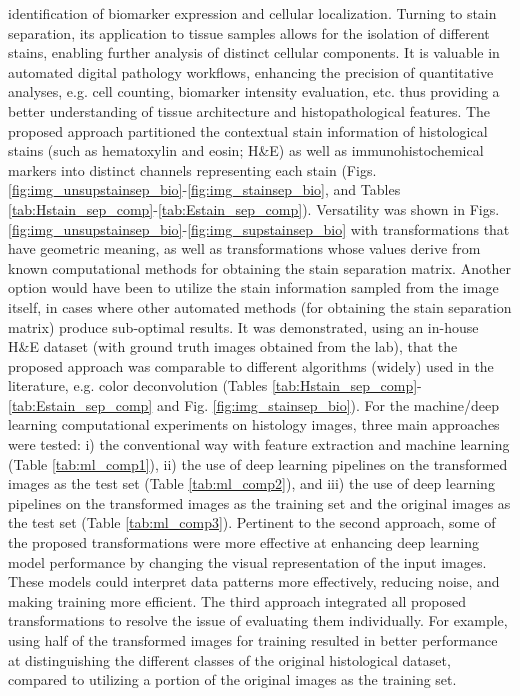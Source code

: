 \documentclass[superscriptaddress,longbibliography,aps,prl,twocolumn,10pt]{revtex4-2}
\begin{document}
identification of biomarker expression and cellular localization. Turning to stain separation, its application to tissue samples allows for the isolation of different stains, enabling further analysis of distinct cellular components. It is valuable in automated digital pathology workflows, enhancing the precision of quantitative analyses, e.g. cell counting, biomarker intensity evaluation, etc. thus providing a better understanding of tissue architecture and histopathological features. The proposed approach partitioned the contextual stain information of histological stains (such as hematoxylin and eosin; H\&E) as well as immunohistochemical markers into distinct channels representing each stain (Figs. \ref{fig:img_unsupstainsep_bio}-\ref{fig:img_stainsep_bio}, and Tables \ref{tab:Hstain_sep_comp}-\ref{tab:Estain_sep_comp}). Versatility was shown in Figs. \ref{fig:img_unsupstainsep_bio}-\ref{fig:img_supstainsep_bio} with transformations that have geometric meaning, as well as transformations whose values derive from known computational methods for obtaining the stain separation matrix. Another option would have been to utilize the stain information sampled from the image itself, in cases where other automated methods (for obtaining the stain separation matrix) produce sub-optimal results. It was demonstrated, using an in-house H\&E dataset (with ground truth images obtained from the lab), that the proposed approach was comparable to different algorithms (widely) used in the literature, e.g. color deconvolution (Tables \ref{tab:Hstain_sep_comp}-\ref{tab:Estain_sep_comp} and Fig. \ref{fig:img_stainsep_bio}). For the machine/deep learning computational experiments on histology images, three main approaches were tested: i) the conventional way with feature extraction and machine learning (Table \ref{tab:ml_comp1}), ii) the use of deep learning pipelines on the transformed images as the test set (Table \ref{tab:ml_comp2}), and iii) the use of deep learning pipelines on the transformed images as the training set and the original images as the test set (Table \ref{tab:ml_comp3}). Pertinent to the second approach, some of the proposed transformations were more effective at enhancing deep learning model performance by changing the visual representation of the input images. These models could interpret data patterns more effectively, reducing noise, and making training more efficient. The third approach integrated all proposed transformations to resolve the issue of evaluating them individually. For example, using half of the transformed images for training resulted in better performance at distinguishing the different classes of the original histological dataset, compared to utilizing a portion of the original images as the training set.
\parskip=5pt
\end{document}
